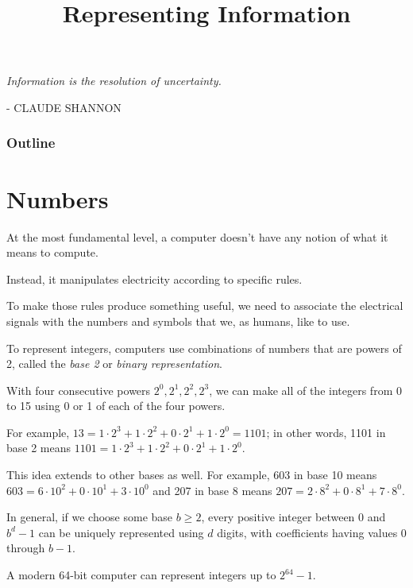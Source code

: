 \documentclass[8pt,a4paper,compress,handout]{beamer}
\title{Representing Information}
\date{}
\begin{document}
\begin{frame}
\hfill
\begin{minipage}{150pt}
\begin{flushright}
\tiny \emph{Information is the resolution of uncertainty.} 

\smallskip

- CLAUDE SHANNON
\end{flushright}
\end{minipage}
\titlepage
\end{frame}

\begin{frame}
\frametitle{Outline}
\tableofcontents
\end{frame}

\section{Numbers}
\begin{frame}[fragile]
At the most fundamental level, a computer doesn't have any notion of what it means to compute. 

\bigskip

Instead, it manipulates electricity according to specific rules.

\bigskip

To make those rules produce something useful, we need to associate the electrical signals with the numbers and symbols that we, as humans, like to use.
\end{frame}

\begin{frame}[fragile]
To represent integers, computers use combinations of numbers that are powers of 2, called the \emph{base 2} or \emph{binary representation}.

\bigskip

With four consecutive powers $2^0, 2^1, 2^2, 2^3$, we can make all of the integers from 0 to 15 using 0 or 1 of each of the four powers. 

\bigskip

For example, $13 = 1 \cdot 2^3 + 1 \cdot 2^2 + 0 \cdot 2^1 + 1 \cdot 2^0 = 1101$; in other words, 1101 in base 2 means $1101 = 1 \cdot 2^3 + 1 \cdot 2^2 + 0 \cdot 2^1 + 1 \cdot 2^0$.

\bigskip

This idea extends to other bases as well. For example, 603 in base 10 means $603 = 6 \cdot 10^2 + 0 \cdot 10^1 + 3 \cdot 10^0$ and 207 in base 8 means $207 = 2 \cdot 8^2 + 0 \cdot 8^1 + 7 \cdot 8^0$. 

\bigskip

In general, if we choose some base $b \geq 2$, every positive integer between 0 and $b^d-1$ can be uniquely represented using $d$ digits, with coefficients having values 0 through $b-1$.

\bigskip

A modern 64-bit computer can represent integers up to $2^{64} - 1$.
\end{frame}
\end{document}

